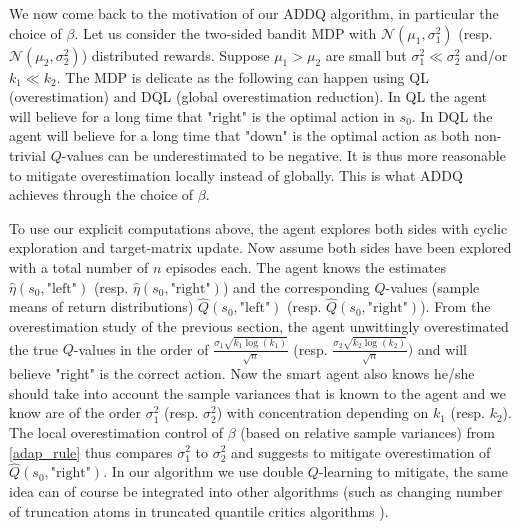 \documentclass{article}
\theoremstyle{plain}
\newtheorem{corollary}[theorem]{Corollary}
\theoremstyle{definition}
\theoremstyle{remark}
\begin{document}
We now come back to the motivation of our ADDQ algorithm, in particular the choice of $\beta$. Let us consider the two-sided bandit MDP with $\mathcal N(\mu_1,\sigma_1^2)$ (resp. $\mathcal N(\mu_2,\sigma_2^2)$) distributed rewards. Suppose $\mu_1>\mu_2$ are small but $\sigma_1^2\ll \sigma_2^2$  and/or $k_1\ll k_2$. The MDP is delicate as the following can happen using QL (overestimation) and DQL (global overestimation reduction). In QL the agent will believe for a long time that "right" is the optimal action in $s_0$. In DQL the agent will believe for a long time that "down" is the optimal action as both non-trivial $Q$-values can be underestimated to be negative. It is thus more reasonable to mitigate overestimation locally instead of globally. This is what ADDQ achieves through the choice of $\beta$.

To use our explicit computations above, the agent explores both sides with cyclic exploration and target-matrix update. Now assume both sides have been explored with a total number of $n$ episodes each. The agent knows the estimates $\hat \eta(s_0,\text{"left"})$ (resp. $\hat \eta(s_0,\text{"right"})$) and the corresponding $Q$-values (sample means of return distributions) $\hat Q(s_0,\text{"left"})$ (resp. $\hat Q(s_0,\text{"right"})$). From the overestimation study of the previous section, the agent unwittingly overestimated the true $Q$-values in the order of $\frac{\sigma_1 \sqrt{k_1\log(k_1)}}{\sqrt{n}}$ (resp. $\frac{\sigma_2 \sqrt{k_2\log(k_2)}}{\sqrt{n}})$ and will believe "right" is the correct action. Now the smart agent also knows he/she should take into account the sample variances that is known to the agent and we know are of the order $\sigma_1^2$ (resp. $\sigma_2^2$) with concentration depending on $k_1$ (resp. $k_2$). The local overestimation control of $\beta$ (based on relative sample variances) from \eqref{adap_rule} thus compares $\sigma_1^2$ to $\sigma_2^2$ and suggests to mitigate overestimation of $\hat Q(s_0,\text{"right"})$. In our algorithm we use double $Q$-learning to mitigate, the same idea can of course be integrated into other algorithms (such as changing number of truncation atoms in truncated quantile critics algorithms \cite{tqc}).
\end{document}
